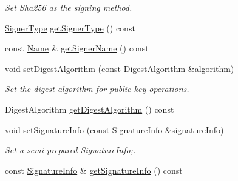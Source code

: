 \begin{DoxyCompactItemize}
\begin{DoxyCompactList}\small\item\em Set Sha256 as the signing method. \end{DoxyCompactList}\item 
\hyperlink{classndn_1_1security_1_1SigningInfo_aae7126c0334e630976d1efbaae3c0102}{Signer\+Type} \hyperlink{classndn_1_1security_1_1SigningInfo_a7b8fda81988031d797f82e57e9baaa18}{get\+Signer\+Type} () const
\item 
const \hyperlink{classndn_1_1Name}{Name} \& \hyperlink{classndn_1_1security_1_1SigningInfo_a47664c823520e07511b43640ce962f1d}{get\+Signer\+Name} () const
\item 
void \hyperlink{classndn_1_1security_1_1SigningInfo_ae80c0ede32ff15f512ff0e9a6b284da7}{set\+Digest\+Algorithm} (const Digest\+Algorithm \&algorithm)\hypertarget{classndn_1_1security_1_1SigningInfo_ae80c0ede32ff15f512ff0e9a6b284da7}{}\label{classndn_1_1security_1_1SigningInfo_ae80c0ede32ff15f512ff0e9a6b284da7}

\begin{DoxyCompactList}\small\item\em Set the digest algorithm for public key operations. \end{DoxyCompactList}\item 
Digest\+Algorithm \hyperlink{classndn_1_1security_1_1SigningInfo_acaac5862d11fecc28d7a80f38e44083a}{get\+Digest\+Algorithm} () const
\item 
void \hyperlink{classndn_1_1security_1_1SigningInfo_ac7411915931611c7504e3c7f2beceac6}{set\+Signature\+Info} (const \hyperlink{classndn_1_1SignatureInfo}{Signature\+Info} \&signature\+Info)\hypertarget{classndn_1_1security_1_1SigningInfo_ac7411915931611c7504e3c7f2beceac6}{}\label{classndn_1_1security_1_1SigningInfo_ac7411915931611c7504e3c7f2beceac6}

\begin{DoxyCompactList}\small\item\em Set a semi-\/prepared \hyperlink{classndn_1_1SignatureInfo}{Signature\+Info};. \end{DoxyCompactList}\item 
const \hyperlink{classndn_1_1SignatureInfo}{Signature\+Info} \& \hyperlink{classndn_1_1security_1_1SigningInfo_a8722c6607e88086e2acf87b0e1e00449}{get\+Signature\+Info} () const
\end{DoxyCompactItemize}
